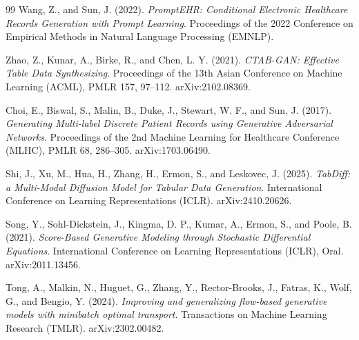 \documentclass[11pt]{informatics-report}
\begin{document}
\begin{thebibliography}{99}
Wang, Z., and Sun, J. (2022).
\textit{PromptEHR: Conditional Electronic Healthcare Records Generation with Prompt Learning}.
Proceedings of the 2022 Conference on Empirical Methods in Natural Language Processing (EMNLP).

Zhao, Z., Kunar, A., Birke, R., and Chen, L. Y. (2021).
\textit{CTAB-GAN: Effective Table Data Synthesizing}.
Proceedings of the 13th Asian Conference on Machine Learning (ACML), PMLR 157, 97--112.
arXiv:2102.08369.

Choi, E., Biswal, S., Malin, B., Duke, J., Stewart, W. F., and Sun, J. (2017).
\textit{Generating Multi-label Discrete Patient Records using Generative Adversarial Networks}.
Proceedings of the 2nd Machine Learning for Healthcare Conference (MLHC), PMLR 68, 286--305.
arXiv:1703.06490.

Shi, J., Xu, M., Hua, H., Zhang, H., Ermon, S., and Leskovec, J. (2025).
\textit{TabDiff: a Multi-Modal Diffusion Model for Tabular Data Generation}.
International Conference on Learning Representations (ICLR).
arXiv:2410.20626.

Song, Y., Sohl-Dickstein, J., Kingma, D. P., Kumar, A., Ermon, S., and Poole, B. (2021).
\textit{Score-Based Generative Modeling through Stochastic Differential Equations}.
International Conference on Learning Representations (ICLR), Oral.
arXiv:2011.13456.

Tong, A., Malkin, N., Huguet, G., Zhang, Y., Rector-Brooks, J., Fatras, K., Wolf, G., and Bengio, Y. (2024).
\textit{Improving and generalizing flow-based generative models with minibatch optimal transport}.
Transactions on Machine Learning Research (TMLR).
arXiv:2302.00482.

\end{thebibliography}


\appendix



\end{document}

